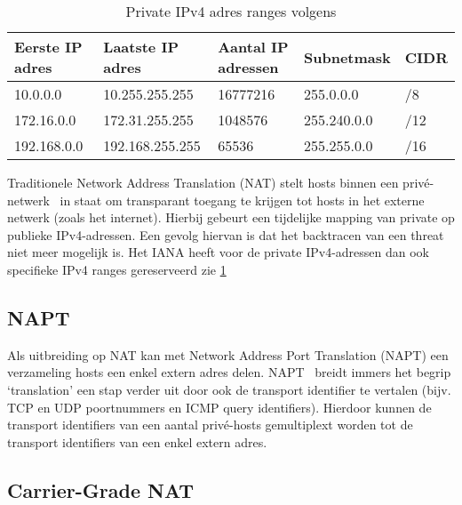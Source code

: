 \begin{table}[!htbp]
    \caption{Private IPv4 adres ranges volgens \textcite{Moskowitz1996}}
    \label{tab:PrivateIPv4AdressRanges}
    \begin{tabular}{lllll}
        \hline
        \multicolumn{1}{|l|}{Eerste IP adres} & \multicolumn{1}{l|}{Laatste IP adres} & \multicolumn{1}{l|}{Aantal IP adressen} & \multicolumn{1}{l|}{Subnetmask} & \multicolumn{1}{l|}{CIDR} \\ \hline
        10.0.0.0                               & 10.255.255.255                       & 16777216                                    & 255.0.0.0                       & /8                        \\
        172.16.0.0                             & 172.31.255.255                       & 1048576                                     & 255.240.0.0                     & /12                       \\
        192.168.0.0                            & 192.168.255.255                      & 65536                                       & 255.255.0.0                     & /16
    \end{tabular}
\end{table}

Traditionele Network Address Translation (NAT) stelt hosts binnen een privé-netwerk~\autocite{Moskowitz1996} in staat om transparant toegang te krijgen tot hosts in het externe netwerk (zoals het internet).
Hierbij gebeurt een tijdelijke mapping van private op publieke IPv4-adressen. Een gevolg hiervan is dat het backtracen van een threat niet meer mogelijk is. Het IANA heeft voor de private IPv4-adressen dan ook specifieke IPv4 ranges gereserveerd zie \ref{tab:PrivateIPv4AdressRanges}

\subsection{NAPT}
Als uitbreiding op NAT kan met Network Address Port Translation (NAPT) een verzameling hosts een enkel extern adres delen. NAPT~\autocite{Holdrege1999} breidt immers het begrip ‘translation’ een stap verder uit door ook de transport identifier te vertalen (bijv. TCP en UDP poortnummers en ICMP query identifiers). Hierdoor kunnen de transport identifiers van een aantal privé-hosts gemultiplext worden tot de\\transport identifiers van een enkel extern adres.

\subsection{Carrier-Grade NAT}


